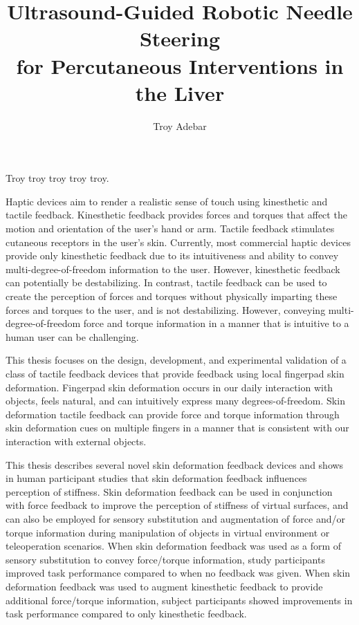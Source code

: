 \documentclass[12pt,twoside]{report}
\begin{document}
\renewcommand{\thepage}{\roman{page}}%

\title{Ultrasound-Guided Robotic Needle Steering\\
            for Percutaneous Interventions in the Liver}
\author{Troy Adebar}
 
\beforepreface

Troy troy troy troy troy.

Haptic devices aim to render a realistic sense of touch using kinesthetic and tactile feedback. Kinesthetic feedback provides forces and torques that affect the motion and orientation of the user’s hand or arm. Tactile feedback stimulates cutaneous receptors in the user’s skin. Currently, most commercial haptic devices provide only kinesthetic feedback due to its intuitiveness and ability to convey multi-degree-of-freedom information to the user. However, kinesthetic feedback can potentially be destabilizing. In contrast, tactile feedback can be used to create the perception of forces and torques without physically imparting these forces and torques to the user, and is not destabilizing. However, conveying multi-degree-of-freedom force and torque information in a manner that is intuitive to a human user can be challenging. 

This thesis focuses on the design, development, and experimental validation of a class of tactile feedback devices that provide feedback using local fingerpad skin deformation. Fingerpad skin deformation occurs in our daily interaction with objects, feels natural, and can intuitively express many degrees-of-freedom. Skin deformation tactile feedback can provide force and torque information through skin deformation cues on multiple fingers in a manner that is consistent with our interaction with external objects.

This thesis describes several novel skin deformation feedback devices and shows in human participant studies that skin deformation feedback influences perception of stiffness. Skin deformation feedback can be used in conjunction with force feedback to improve the perception of stiffness of virtual surfaces, and can also be employed for sensory substitution and augmentation of force and/or torque information during manipulation of objects in virtual environment or teleoperation scenarios. When skin deformation feedback was used as a form of sensory substitution to convey force/torque information, study participants improved task performance compared to when no feedback was given. When skin deformation feedback was used to augment kinesthetic feedback to provide additional force/torque information, subject participants showed improvements in task performance compared to only kinesthetic feedback.
\end{document}
